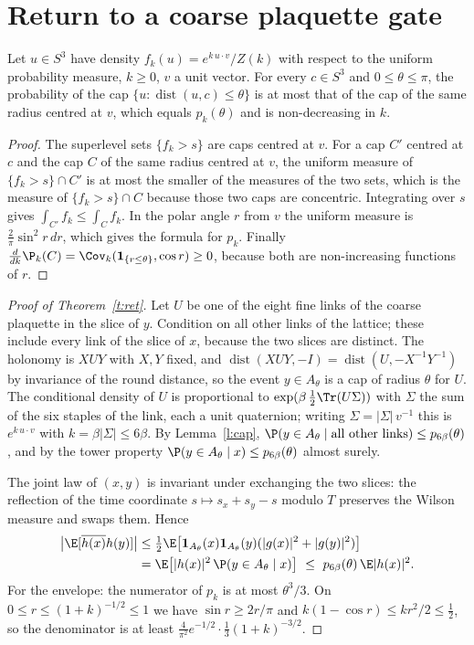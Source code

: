 \section{Return to a coarse plaquette gate}\label{s:ret}
\begin{lemma}\label{l:cap}
Let $u\in S^3$ have density $f_k(u)=e^{k\,u\cdot v}/Z(k)$ with respect to the uniform probability measure,
$k\ge0$, $v$ a unit vector. For every $c\in S^3$ and $0\le\theta\le\pi$, the probability of the cap
$\{u:\operatorname{dist}(u,c)\le\theta\}$ is at most that of the cap of the same radius centred at $v$, which
equals $p_k(\theta)$ and is non-decreasing in $k$.
\end{lemma}
\begin{proof}
The superlevel sets $\{f_k>s\}$ are caps centred at $v$. For a cap $C'$ centred at $c$ and the cap $C$ of the
same radius centred at $v$, the uniform measure of $\{f_k>s\}\cap C'$ is at most the smaller of the measures of
the two sets, which is the measure of $\{f_k>s\}\cap C$ because those two caps are concentric. Integrating
over $s$ gives $\int_{C'}f_k\le\int_Cf_k$. In the polar angle $r$ from $v$ the uniform measure is
$\tfrac2\pi\sin^2r\,dr$, which gives the formula for $p_k$. Finally $\frac{d}{dk}\P_k(C)=
\Cov_k(\mathbf 1_{\{r\le\theta\}},\cos r)\ge0$, because both are non-increasing functions of $r$.
\end{proof}

\begin{proof}[Proof of Theorem~\ref{t:ret}]
Let $U$ be one of the eight fine links of the coarse plaquette in the slice of $y$. Condition on all other
links of the lattice; these include every link of the slice of $x$, because the two slices are distinct. The
holonomy is $XUY$ with $X,Y$ fixed, and $\operatorname{dist}(XUY,-I)=\operatorname{dist}(U,-X^{-1}Y^{-1})$ by
invariance of the round distance, so the event $y\in A_\theta$ is a cap of radius $\theta$ for $U$. The
conditional density of $U$ is proportional to $\exp(\beta\,\tfrac12\Tr(U\Sigma))$ with $\Sigma$ the sum of the
six staples of the link, each a unit quaternion; writing $\Sigma=|\Sigma|\,v^{-1}$ this is $e^{k\,u\cdot v}$ with
$k=\beta|\Sigma|\le6\beta$. By Lemma~\ref{l:cap}, $\P(y\in A_\theta\mid\text{all other links})\le
p_{6\beta}(\theta)$, and by the tower property $\P(y\in A_\theta\mid x)\le p_{6\beta}(\theta)$ almost surely.

The joint law of $(x,y)$ is invariant under exchanging the two slices: the reflection of the time coordinate
$s\mapsto s_x+s_y-s$ modulo $T$ preserves the Wilson measure and swaps them. Hence
\begin{align*}
\big|\E[\overline{h(x)}h(y)]\big|&\le\tfrac12\E\big[\mathbf 1_{A_\theta}(x)\mathbf 1_{A_\theta}(y)(|g(x)|^2+|g(y)|^2)\big]\\
&=\E\big[|h(x)|^2\,\P(y\in A_\theta\mid x)\big]\ \le\ p_{6\beta}(\theta)\,\E|h(x)|^2 .
\end{align*}
For the envelope: the numerator of $p_k$ is at most $\theta^3/3$. On $0\le r\le(1+k)^{-1/2}\le1$ we have
$\sin r\ge2r/\pi$ and $k(1-\cos r)\le kr^2/2\le\tfrac12$, so the denominator is at least
$\tfrac{4}{\pi^2}e^{-1/2}\cdot\tfrac13(1+k)^{-3/2}$.
\end{proof}

